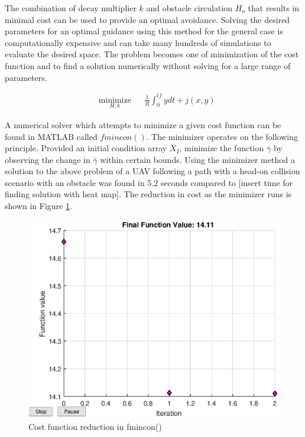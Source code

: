 \documentclass[numbered,pdftex]{ohio-etd}
\begin{document}
The combination of decay multiplier $k$ and obstacle circulation $H_o$ that results in minimal cost can be used to provide an optimal avoidance. Solving the desired parameters for an optimal guidance using this method for the general case is computationally expensive and can take many hundreds of simulations to evaluate the desired space. The problem becomes one of minimization of the cost function and to find a solution numerically without solving for a large range of parameters. 

\begin{equation}
\label{eq:staticCost}
\begin{aligned}
& \underset{H,k}{\text{minimize}}
& & \frac{1}{R}\int_{0}^{tf}ydt + j(x,y) 
\end{aligned}
\end{equation}

A numerical solver which attempts to minimize a given cost function can be found in MATLAB called $fmincon()$. The minimizer operates on the following principle. Provided an initial condition array $X_I$, minimize the function $\bar{\gamma}$ by observing the change in $\bar{\gamma}$ within certain bounds. Using the minimizer method a solution to the above problem of a UAV following a path with a head-on collision scenario with an obstacle was found in 5.2 seconds compared to [insert time for finding solution with heat map]. The reduction in cost as the minimizer runs is shown in Figure \ref{fig:finalfunctionvalue}.

\begin{figure}[H]
	\centering
	\includegraphics[width=12cm]{PaperFigures/Methods/finalFunctionValue}
	\caption{Cost function reduction in fmincon()}
	\label{fig:finalfunctionvalue}
\end{figure}
\end{document}
